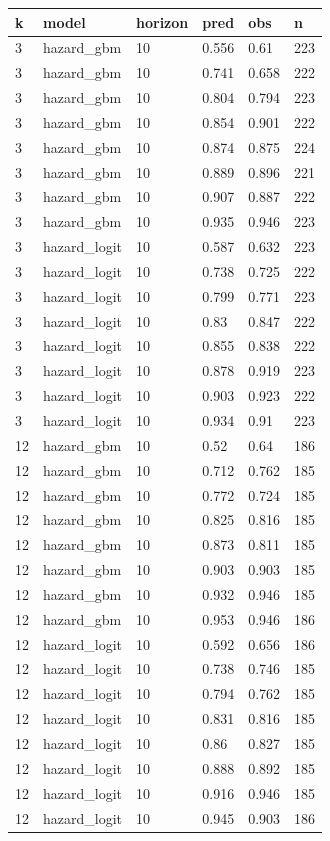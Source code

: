 \begin{tabular}{llllll}
\toprule
k & model & horizon & pred & obs & n \\
\midrule
3 & hazard\_gbm & 10 & 0.556 & 0.61 & 223 \\
3 & hazard\_gbm & 10 & 0.741 & 0.658 & 222 \\
3 & hazard\_gbm & 10 & 0.804 & 0.794 & 223 \\
3 & hazard\_gbm & 10 & 0.854 & 0.901 & 222 \\
3 & hazard\_gbm & 10 & 0.874 & 0.875 & 224 \\
3 & hazard\_gbm & 10 & 0.889 & 0.896 & 221 \\
3 & hazard\_gbm & 10 & 0.907 & 0.887 & 222 \\
3 & hazard\_gbm & 10 & 0.935 & 0.946 & 223 \\
3 & hazard\_logit & 10 & 0.587 & 0.632 & 223 \\
3 & hazard\_logit & 10 & 0.738 & 0.725 & 222 \\
3 & hazard\_logit & 10 & 0.799 & 0.771 & 223 \\
3 & hazard\_logit & 10 & 0.83 & 0.847 & 222 \\
3 & hazard\_logit & 10 & 0.855 & 0.838 & 222 \\
3 & hazard\_logit & 10 & 0.878 & 0.919 & 223 \\
3 & hazard\_logit & 10 & 0.903 & 0.923 & 222 \\
3 & hazard\_logit & 10 & 0.934 & 0.91 & 223 \\
12 & hazard\_gbm & 10 & 0.52 & 0.64 & 186 \\
12 & hazard\_gbm & 10 & 0.712 & 0.762 & 185 \\
12 & hazard\_gbm & 10 & 0.772 & 0.724 & 185 \\
12 & hazard\_gbm & 10 & 0.825 & 0.816 & 185 \\
12 & hazard\_gbm & 10 & 0.873 & 0.811 & 185 \\
12 & hazard\_gbm & 10 & 0.903 & 0.903 & 185 \\
12 & hazard\_gbm & 10 & 0.932 & 0.946 & 185 \\
12 & hazard\_gbm & 10 & 0.953 & 0.946 & 186 \\
12 & hazard\_logit & 10 & 0.592 & 0.656 & 186 \\
12 & hazard\_logit & 10 & 0.738 & 0.746 & 185 \\
12 & hazard\_logit & 10 & 0.794 & 0.762 & 185 \\
12 & hazard\_logit & 10 & 0.831 & 0.816 & 185 \\
12 & hazard\_logit & 10 & 0.86 & 0.827 & 185 \\
12 & hazard\_logit & 10 & 0.888 & 0.892 & 185 \\
12 & hazard\_logit & 10 & 0.916 & 0.946 & 185 \\
12 & hazard\_logit & 10 & 0.945 & 0.903 & 186 \\
\bottomrule
\end{tabular}